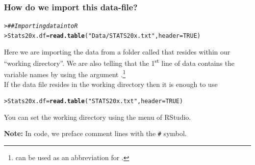 \documentclass{beamer}\usepackage[]{graphicx}\usepackage[]{xcolor}
\makeatletter
\newcommand{\hlnum}[1]{\textcolor[rgb]{0.686,0.059,0.569}{#1}}%
\newcommand{\hlstr}[1]{\textcolor[rgb]{0.192,0.494,0.8}{#1}}%
\newcommand{\hlcom}[1]{\textcolor[rgb]{0.678,0.584,0.686}{\textit{#1}}}%
\newcommand{\hlstd}[1]{\textcolor[rgb]{0.345,0.345,0.345}{#1}}%
\newcommand{\hlkwb}[1]{\textcolor[rgb]{0.69,0.353,0.396}{#1}}%
\newcommand{\hlkwc}[1]{\textcolor[rgb]{0.333,0.667,0.333}{#1}}%
\newcommand{\hlkwd}[1]{\textcolor[rgb]{0.737,0.353,0.396}{\textbf{#1}}}%
\newenvironment{kframe}{%
 \def\at@end@of@kframe{}%
 \ifinner\ifhmode%
  \def\at@end@of@kframe{\end{minipage}}%
  \begin{minipage}{\columnwidth}%
 \fi\fi%
 \def\FrameCommand##1{\hskip\@totalleftmargin \hskip-\fboxsep
 \colorbox{shadecolor}{##1}\hskip-\fboxsep
     \hskip-\linewidth \hskip-\@totalleftmargin \hskip\columnwidth}%
 \MakeFramed {\advance\hsize-\width
   \@totalleftmargin\z@ \linewidth\hsize
   \@setminipage}}%
 {\par\unskip\endMakeFramed%
 \at@end@of@kframe}
\newenvironment{knitrout}{}{} %
\makeatother
\begin{document}
\begin{frame}[fragile]
\frametitle{How do we import this data-file?}
\begin{knitrout}\scriptsize
{}\color{fgcolor}\begin{kframe}
\begin{alltt}
\hlstd{> }\hlcom{## Importing data into R}
\hlstd{> }\hlstd{Stats20x.df} \hlkwb{=} \hlkwd{read.table}\hlstd{(}\hlstr{"Data/STATS20x.txt"}\hlstd{,} \hlkwc{header}\hlstd{=}\hlnum{TRUE}\hlstd{)}
\end{alltt}
\end{kframe}
\end{knitrout}
Here we are importing the  data from a folder called  that resides within our ``working directory''.
We are also telling  that the 1\textsuperscript{st} line of data contains the variable names by using
the argument .\footnote{ can be used as an abbreviation for . } \\[9mm]

If the data file resides in the working directory then it is enough to use
\begin{knitrout}\scriptsize
{}\color{fgcolor}\begin{kframe}
\begin{alltt}
\hlstd{> }\hlstd{Stats20x.df} \hlkwb{=} \hlkwd{read.table}\hlstd{(}\hlstr{"STATS20x.txt"}\hlstd{,} \hlkwc{header}\hlstd{=}\hlnum{TRUE}\hlstd{)}
\end{alltt}
\end{kframe}
\end{knitrout}

You can set the working directory using the  menu of RStudio.

{\bf Note:} In  code, we preface comment lines with the  {\color{darkgreen}\verb|#|} symbol.

\end{frame}


\end{document}
